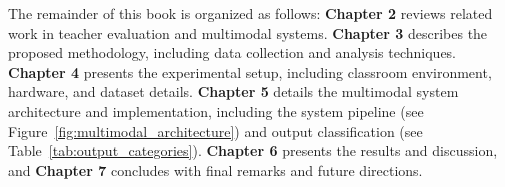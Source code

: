 The remainder of this book is organized as follows: \textbf{Chapter 2} reviews related work in teacher evaluation and multimodal systems. \textbf{Chapter 3} describes the proposed methodology, including data collection and analysis techniques. \textbf{Chapter 4} presents the experimental setup, including classroom environment, hardware, and dataset details. \textbf{Chapter 5} details the multimodal system architecture and implementation, including the system pipeline (see Figure~\ref{fig:multimodal_architecture}) and output classification (see Table~\ref{tab:output_categories}). \textbf{Chapter 6} presents the results and discussion, and \textbf{Chapter 7} concludes with final remarks and future directions.
